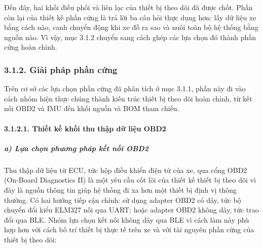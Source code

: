 \documentclass[a4paper]{extarticle}
\begin{document}
Đến đây, hai khối điều phối và liên lạc của thiết bị theo dõi đã được chốt. Phần
còn lại của thiết kế phần cứng là trả lời ba câu hỏi thực dụng hơn: lấy
dữ liệu xe bằng cách nào, canh chuyển động khi xe đỗ ra sao và nuôi
toàn bộ hệ thống bằng nguồn nào. Vì vậy, mục 3.1.2 chuyển sang cách ghép
các lựa chọn đó thành phần cứng hoàn chỉnh.


\subsubsection{3.1.2. Giải pháp phần
cứng}\label{321-giux1ea3i-phuxe1p-phux1ea7n-cux1ee9ng}

Trên cơ sở các lựa chọn phần cứng đã phân tích ở mục 3.1.1, phần này đi
vào cách nhóm hiện thực chúng thành kiến trúc thiết bị theo dõi hoàn chỉnh, từ
kết nối OBD2 và IMU đến khối nguồn và BOM tham chiếu.

\paragraph{3.1.2.1. Thiết kế khối thu thập dữ liệu
OBD2}\label{3211-thiux1ebft-kux1ebf-muxf4-ux111un-thu-thux1eadp-dux1eef-liux1ec7u-obd2}

\subparagraph{a) Lựa chọn phương pháp kết nối
OBD2}\label{a-lux1ef1a-chux1ecdn-phux1b0ux1a1ng-phuxe1p-kux1ebft-nux1ed1i-obd2}

Thu thập dữ liệu từ ECU, tức hộp điều khiển điện tử của xe, qua cổng OBD2
(On-Board Diagnostics II) là một yêu cầu cốt lõi của thiết kế thiết bị theo dõi vì
đây là nguồn thông tin giúp hệ thống đi xa hơn một thiết bị định vị
thông thường. Có hai hướng tiếp cận chính: sử dụng adapter OBD2 có dây,
tức bộ chuyển đổi kiểu ELM327 nối qua UART; hoặc adapter OBD2 không dây,
tức trao đổi qua BLE. Nhóm lựa chọn kết nối không dây qua BLE vì cách
làm này phù hợp hơn với cách bố trí thiết bị thực tế trên xe và với tài
nguyên phần cứng của thiết bị theo dõi:
\end{document}
